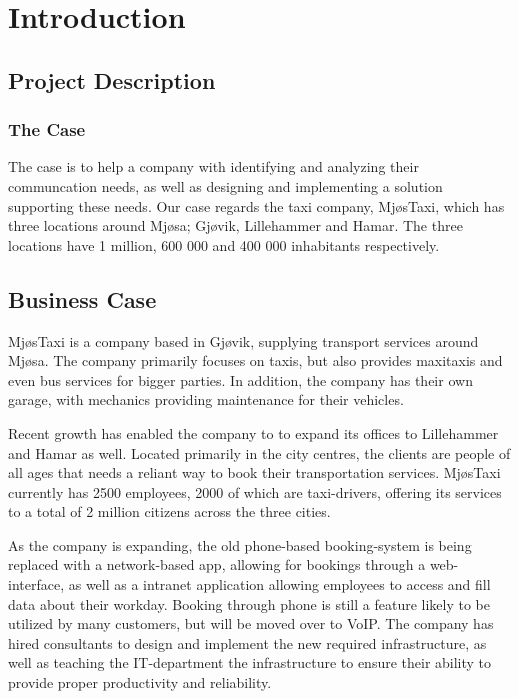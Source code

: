 \chapter{Introduction}
\label{chap:introduction}

\section{Project Description}

\subsection{The Case}
The case is to help a company with identifying and analyzing their communcation needs, as well as designing and implementing a solution supporting these needs. 
Our case regards the taxi company, MjøsTaxi, which has three locations around Mjøsa; Gjøvik, Lillehammer and Hamar.
The three locations have 1 million, 600 000 and 400 000 inhabitants respectively.


\section{Business Case}
MjøsTaxi is a company based in Gjøvik, supplying transport services around Mjøsa. 
The company primarily focuses on taxis, but also provides maxitaxis and even bus services for bigger parties.
In addition, the company has their own garage, with mechanics providing maintenance for their vehicles.

Recent growth has enabled the company to to expand its offices to Lillehammer and Hamar as well. 
Located primarily in the city centres, the clients are people of all ages that needs a reliant way to book their transportation services.
MjøsTaxi currently has 2500 employees, 2000 of which are taxi-drivers, offering its services to a total of 2 million citizens across the three cities.

As the company is expanding, the old phone-based booking-system is being replaced with a network-based app, allowing for bookings through a web-interface, as well as a intranet application allowing employees to access and fill data about their workday. %
Booking through phone is still a feature likely to be utilized by many customers, but will be moved over to VoIP.
The company has hired consultants to design and implement the new required infrastructure, as well as teaching the IT-department the infrastructure to ensure their ability to provide proper productivity and reliability.


